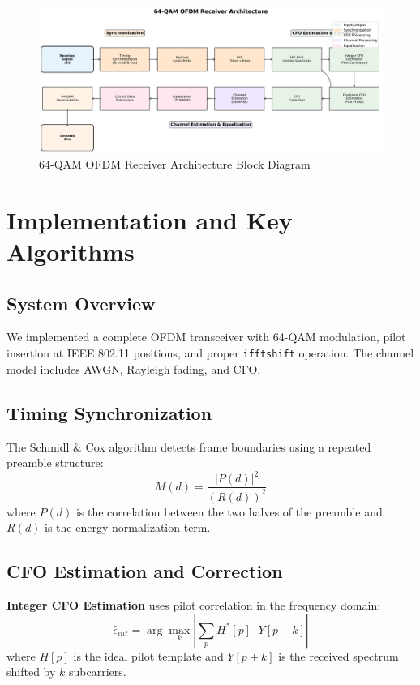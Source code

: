\documentclass[11pt,a4paper]{article}
\begin{document}
\begin{figure}[H]
    \centering
    \includegraphics[width=\textwidth]{ofdm_receiver_block_diagram.png}
    \caption{64-QAM OFDM Receiver Architecture Block Diagram}
    \label{fig:block_diagram}
\end{figure}

\section{Implementation and Key Algorithms}

\subsection{System Overview}
We implemented a complete OFDM transceiver with 64-QAM modulation, pilot insertion at IEEE 802.11 positions, and proper \texttt{ifftshift} operation. The channel model includes AWGN, Rayleigh fading, and CFO.

\subsection{Timing Synchronization}
The Schmidl \& Cox algorithm detects frame boundaries using a repeated preamble structure:
\begin{equation}
M(d) = \frac{|P(d)|^2}{(R(d))^2}
\end{equation}
where $P(d)$ is the correlation between the two halves of the preamble and $R(d)$ is the energy normalization term.

\subsection{CFO Estimation and Correction}
\textbf{Integer CFO Estimation} uses pilot correlation in the frequency domain:
\begin{equation}
\hat{\epsilon}_{int} = \arg\max_k \left| \sum_{p} H^*[p] \cdot Y[p+k] \right|
\end{equation}
where $H[p]$ is the ideal pilot template and $Y[p+k]$ is the received spectrum shifted by $k$ subcarriers.
\end{document}
